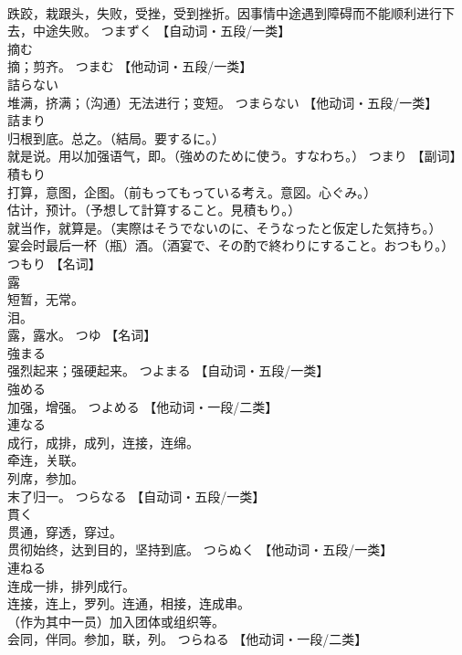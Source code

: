 \documentclass[8pt]{extreport}
\begin{document}
\begin{CJK}{UTF8}{min}
\\	跌跤，栽跟头，失败，受挫，受到挫折。因事情中途遇到障碍而不能顺利进行下去，中途失败。	つまずく		【自动词・五段/一类】
\\	摘む	
\\	摘；剪齐。	つまむ		【他动词・五段/一类】
\\	詰らない	
\\	堆满，挤满；（沟通）无法进行；变短。	つまらない		【他动词・五段/一类】
\\	詰まり	
\\	归根到底。总之。（結局。要するに。） 
\\	就是说。用以加强语气，即。（強めのために使う。すなわち。）	つまり		【副词】
\\	積もり	
\\	打算，意图，企图。（前もってもっている考え。意図。心ぐみ。） 
\\	估计，预计。（予想して計算すること。見積もり。） 
\\	就当作，就算是。（実際はそうでないのに、そうなったと仮定した気持ち。） 
\\	宴会时最后一杯（瓶）酒。（酒宴で、その酌で終わりにすること。おつもり。）	つもり		【名词】
\\	露	
\\	短暂，无常。 
\\	泪。 
\\	露，露水。	つゆ		【名词】
\\	強まる	
\\	强烈起来；强硬起来。	つよまる		【自动词・五段/一类】
\\	強める	
\\	加强，增强。	つよめる		【他动词・一段/二类】
\\	連なる	
\\	成行，成排，成列，连接，连绵。 
\\	牵连，关联。 
\\	列席，参加。 
\\	末了归一。	つらなる		【自动词・五段/一类】
\\	貫く	
\\	贯通，穿透，穿过。 
\\	贯彻始终，达到目的，坚持到底。	つらぬく		【他动词・五段/一类】
\\	連ねる	
\\	连成一排，排列成行。 
\\	连接，连上，罗列。连通，相接，连成串。 
\\	（作为其中一员）加入团体或组织等。 
\\	会同，伴同。参加，联，列。	つらねる		【他动词・一段/二类】

\end{CJK}
\end{document}
